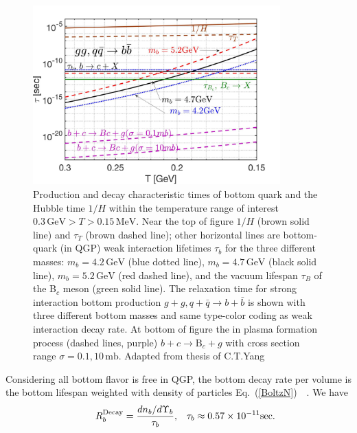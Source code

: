 \begin{figure}[ht]
\begin{center}
\includegraphics[width=0.85\textwidth]{./plots/BQuarkReactionTime003}
\caption{Production and decay characteristic times of bottom quark and the Hubble time $1/H$ within the temperature range of interest  $ 0.3\,\mathrm{GeV}>T> 0.15\,\mathrm{MeV}$. Near the top of figure  $1/H$ (brown solid line) and $\tau_T$ (brown dashed line); other horizontal lines are bottom-quark (in QGP) weak interaction lifetimes $\tau_b$ for the three different masses: $m_b=4.2\,\mathrm{GeV}$ (blue dotted line), $m_b=4.7\,\mathrm{GeV}$ (black solid  line), $m_b=5.2\,\mathrm{GeV}$ (red dashed line), and the vacuum lifespan $\tau_B$ of the  B$_c$ meson (green solid  line). The relaxation time for strong interaction bottom production $g+g, q+\bar q\rightarrow b+\bar{b}$ is shown with three different bottom masses and same type-color coding as weak interaction decay rate. At bottom of figure the in plasma formation process (dashed lines, purple) $b+c\rightarrow \mathrm{B}_c+g$ with cross section range $\sigma=0.1,10\,\mathrm{mb}$. Adapted from thesis of C.T.Yang \cite{Yang:2024ret}}
\label{ReactionTime}
\end{center}
\end{figure}
Considering all bottom flavor is free in QGP, the bottom decay rate per volume is the bottom lifespan weighted with density of particles Eq.~(\ref{BoltzN})~~\cite{Kuznetsova:2008jt}. We have
\begin{align}\hspace{0.5cm}
R^{\mathrm{Decay}}_b=\frac{dn_b/d\Upsilon_b}{\tau_b},\,\,\,\,\, \tau_b\approx0.57\times10^{-11} \mathrm{sec}.
\end{align}
